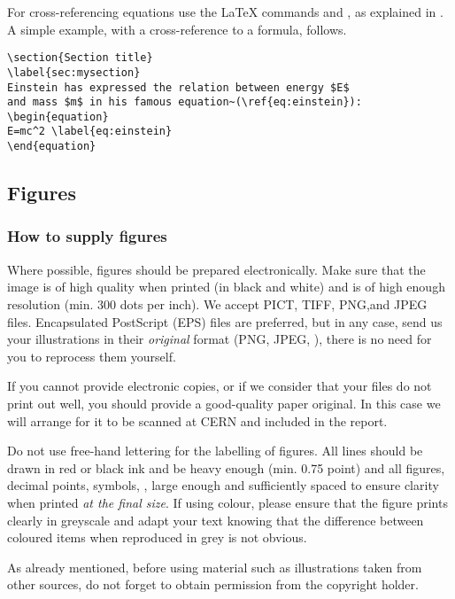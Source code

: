 \documentclass{cernrep}
\begin{document}
For cross-referencing equations use the \LaTeX{} commands 
and , as explained in .
A simple example, with a cross-reference to a formula, follows.

\begin{verbatim}
\section{Section title}
\label{sec:mysection}
Einstein has expressed the relation between energy $E$ 
and mass $m$ in his famous equation~(\ref{eq:einstein}):
\begin{equation}
E=mc^2 \label{eq:einstein}
\end{equation}
\end{verbatim}

\subsection{Figures}
\label{sec:figures}

\subsubsection{How to supply figures}

Where possible, figures should be prepared electronically.  Make sure
that the image is of high quality when printed (in black and white)
and is of high enough resolution (min. 300 dots per inch). We accept
PICT, TIFF, PNG,and JPEG files.  Encapsulated PostScript (EPS) files
are preferred, but in any case, send us your illustrations in their
\emph{original} format (PNG, JPEG, \etc), there is no need for you to
reprocess them yourself.

If you cannot provide electronic copies, or if we consider that your
files do not print out well, you should provide a good-quality paper
original. In this case we will arrange for it to be scanned at CERN
and included in the report.

Do not use free-hand lettering for the labelling of figures. All lines
should be drawn in red or black ink and be heavy enough (min. 0.75
point) and all figures, decimal points, symbols, \etc, large enough
and sufficiently spaced to ensure clarity when printed \emph{at the
final size}. If using colour, please ensure that the figure prints
clearly in greyscale and adapt your text knowing that the difference
between coloured items when reproduced in grey is not obvious.

As already mentioned, before using material such as illustrations
taken from other sources, do not forget to obtain permission from the
copyright holder.
\end{document}
